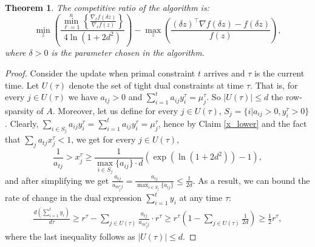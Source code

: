 \documentclass[letterpaper,11pt]{article}
\newtheorem{thm}{Theorem}[section]
\newcommand{\trans}{\intercal}
\begin{document}
\begin{thm}
\label{thm:cr-gen}
The competitive ratio of the algorithm is:
\begin{equation}
\min_{z} \left(\frac{\min_{\ell=1}^{n}\left\{\frac{\nabla_\ell f(\delta z)}{\nabla_\ell f(z)}\right\}}{4\ln(1+2d^2)}\right) -
\max_{z} \left(\frac{(\delta z)^\trans \nabla f(\delta z) - f(\delta z) }{f(z)}\right),
\end{equation}
where $\delta > 0$ is the parameter chosen in the algorithm.
\end{thm}

\begin{proof}
Consider the update when primal constraint $t$ arrives and $\tau$ is the current time.
Let $U(\tau)$ denote the set of tight dual constraints at time $\tau$. That is, for every $j\in U(\tau)$ we have $a_{tj}>0$ and $\sum_{i=1}^{t}a_{ij}y^{\tau}_i = \mu^{\tau}_j$. So $|U(\tau)|\le d$ the row-sparsity of $A$. Moreover, let us define for every $j\in U(\tau)$,  $S_j=\{i | a_{ij}>0, y^\tau_{i}>0\}$.
Clearly, $\sum_{i\in S_j}a_{ij}y^{\tau}_i = \sum_{i=1}^{t}a_{ij}y^{\tau}_i = \mu^{\tau}_j$, hence by Claim \ref{x_lower} and the fact that $\sum_j a_{t j}x_{j}^{\tau} < 1$, we get for every $j\in U(\tau)$,
$$ \frac{1}{a_{t j}} > x_{j}^{\tau} \geq \frac{1}{\max_{i\in S_j}\{a_{ij}\}\cdot d}\left(\exp\left(\ln(1+2d^2)\right)-1\right) ,$$
and after simplifying we get $ \frac{a_{t j}}{a_{m^\star_j j}} = \frac{a_{t j}}{\max_{i\in S_j}\{a_{i j}\}} \leq \frac{1}{2d}$.
As a result, we can bound the rate of change in the dual expression $\sum_{i=1}^{t}y_i$ at any time $\tau$:
\begin{align}
\frac{d \left(\sum_{i=1}^{t}y_i\right)}{d \tau} \geq r^{\tau} - \sum_{j \in U(\tau)}\frac{a_{t j}}{a_{m^\star_j j}} \cdot r^{\tau} \geq r^{\tau} \left(1 - \sum_{j \in U(\tau)}\frac{1}{2d}\right) \geq \frac{1}{2}r^{\tau} \label{d_dual},
\end{align}
where the last inequality follows as $|U(\tau)|\leq d$.


\end{proof}
\end{document}
